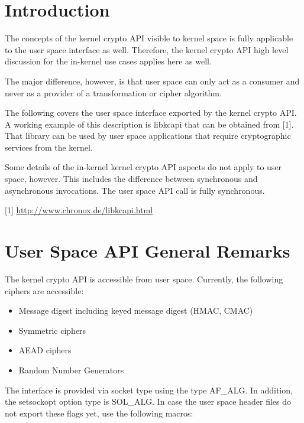 \documentclass[a4paper,8pt,english]{sphinxmanual}
\begin{document}
\section{Introduction}
\label{crypto/userspace-if:introduction}
The concepts of the kernel crypto API visible to kernel space is fully
applicable to the user space interface as well. Therefore, the kernel
crypto API high level discussion for the in-kernel use cases applies
here as well.

The major difference, however, is that user space can only act as a
consumer and never as a provider of a transformation or cipher
algorithm.

The following covers the user space interface exported by the kernel
crypto API. A working example of this description is libkcapi that can
be obtained from {[}1{]}. That library can be used by user space
applications that require cryptographic services from the kernel.

Some details of the in-kernel kernel crypto API aspects do not apply to
user space, however. This includes the difference between synchronous
and asynchronous invocations. The user space API call is fully
synchronous.

{[}1{]} \href{http://www.chronox.de/libkcapi.html}{http://www.chronox.de/libkcapi.html}


\section{User Space API General Remarks}
\label{crypto/userspace-if:user-space-api-general-remarks}
The kernel crypto API is accessible from user space. Currently, the
following ciphers are accessible:
\begin{itemize}
\item {} 
Message digest including keyed message digest (HMAC, CMAC)

\item {} 
Symmetric ciphers

\item {} 
AEAD ciphers

\item {} 
Random Number Generators

\end{itemize}

The interface is provided via socket type using the type AF\_ALG. In
addition, the setsockopt option type is SOL\_ALG. In case the user space
header files do not export these flags yet, use the following macros:
\end{document}
